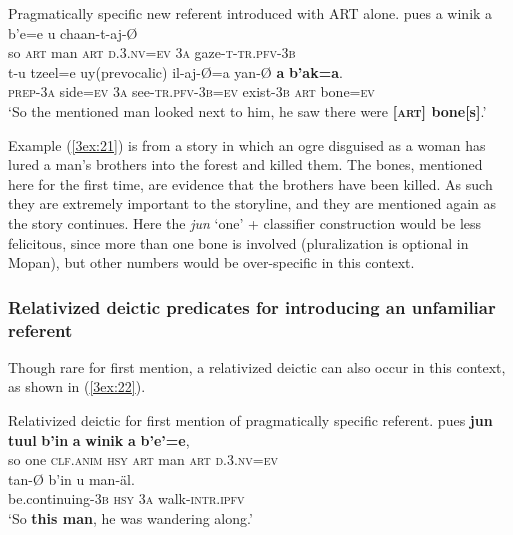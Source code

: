 \documentclass[output=paper]{langsci/langscibook}
\begin{document}
\begin{exe}
\ex\label{3ex:21}
Pragmatically specific new referent introduced with ART alone. 
\exi{}
\gll	pues	a 	winik	a 	b’e=e 			u 		chaan-t-aj-\O  \\
	so	{\textsc{art}}	man	{\textsc{art}}	{\textsc{d.3.nv=ev}}		{\textsc{3a}}	gaze-{\textsc{t-tr.pfv-3b}} \\
\glt
\exi{}
\gll	t-u  			tzeel=e 		uy(prevocalic) 	il-aj-\O=a  yan-{\O} 		{\textbf{a}} 	{\textbf{b'ak=a}}.\\
	{\textsc{prep-3a}}	side={\textsc{ev}} 	{\textsc{3a}} 		see-{\textsc{tr.pfv-3b=ev}}  exist-{\textsc{3b}} 	{\textsc{art}}		bone={\textsc{ev}} \\
\glt	`So the mentioned man looked next to him, he saw there were {\textbf{[{\textsc{art}}] bone[s]}}.'
\end{exe}

Example (\ref{3ex:21}) is from a story in which an ogre disguised as a woman has lured a man's brothers into the forest and killed them.  The bones, mentioned here for the first time, are evidence that the brothers have been killed. As such they are extremely important to the storyline, and they are mentioned again as the story continues.  Here the {\emph{jun}} `one' + classifier construction would be less felicitous, since more than one bone is involved (pluralization is optional in Mopan), but other numbers would be over-specific in this context.  


\subsubsection{Relativized deictic predicates for introducing an unfamiliar referent}\label{3sec:332}

Though rare for first mention, a relativized deictic can also occur in this context, as shown in (\ref{3ex:22}).

\begin{exe}
\ex\label{3ex:22}
Relativized deictic for first mention of pragmatically specific referent. 
\exi{}
\gll	pues 	{\textbf{jun}} 	{\textbf{tuul}} 		{\textbf{b'in}} 		{\textbf{a}} 	{\textbf{winik}} 	{\textbf{a}}	{\textbf{b'e'=e}}, \\
	so		one		{\textsc{clf.anim}}	{\textsc{hsy}}		{\textsc{art}}	man			{\textsc{art}}	{\textsc{d.3.nv=ev}} \\
\glt
\exi{}
\gll	tan-{\O} 				b'in 			u 		man-\"al. \\
	be.continuing-{\textsc{3b}}	{\textsc{hsy}}		{\textsc{3a}}	walk-{\textsc{intr.ipfv}} \\
\glt	`So {\textbf{this man}}, he was wandering along.'
\end{exe}
\end{document}
